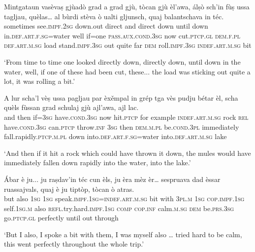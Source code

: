 \begin{linenumbers}
\gll  Mintgataun vasèvaṣ gjùadò grad a grad gjù, tòcan gjù èl’awa, álṣò sch’in fùṣ ussa tagljau, quèlas… al bùrdi stèva ò ualti gljunsch, quaj balantschava in téc.  \\
sometimes see.\textsc{impf.2sg} down.out direct and direct down until down in.\textsc{def.art.f.sg=}water well if=one \textsc{pass.aux.cond.3sg} now cut.\textsc{ptcp.gl} \textsc{dem.f.pl}  \textsc{def.art.m.sg} load  stand.\textsc{impf.3sg} out quite far \textsc{dem} roll.\textsc{impf.3sg}  \textsc{indef.art.m.sg} bit   \\
\end{linenumbers}
\medskip
\glt `From time to time one looked directly down, directly down, until down in the water, well, if one of these had been cut, these... the load was sticking out quite a lot, it was rolling a bit.'
\medskip

\begin{linenumbers}
\gll   A lur scha’l vèṣ ussa pagljau par èxěmpal in grép tga vès pudju bétar èl, scha quèls fùssan grad schulaj gjù ajl’awa, ajl lac. \\
and then if=\textsc{3sg} have.\textsc{cond.3sg} now hit.\textsc{ptcp} for example \textsc{indef.art.m.sg} rock \textsc{rel} have.\textsc{cond.3sg}  can.\textsc{ptcp} throw.\textsc{inf} \textsc{3sg} then \textsc{dem.m.pl} be.\textsc{cond.3pl} immediately fall.rapidly.\textsc{ptcp.m.pl} down into.\textsc{def.art.f.sg}=water into.\textsc{def.art.m.sg} lake\\
\end{linenumbers}
\medskip
\glt `And then if it hit a rock which could have thrown it down, the mules would have immediately fallen down rapidly into the water, into the lake.'
\medskip

\begin{linenumbers}
\gll Ábar è ju... ju raṣdav'in téc cun èls, ju èra mèz èr… sespruava dad èssar ruassajvals, quaj è ju tiptòp, tòcan ò atras.   \\
but also \textsc{1sg} \textsc{1sg} speak.\textsc{impf.1sg}=\textsc{indef.art.m.sg} bit with  \textsc{3pl.m} \textsc{1sg} \textsc{cop.impf.1sg} self.\textsc{1sg.m} also \textsc{refl.}try.hard.\textsc{impf.1sg} \textsc{comp} \textsc{cop.inf}  calm.\textsc{m.sg} \textsc{dem} be.\textsc{prs.3sg} go.\textsc{ptcp.gl} perfectly until out through \\
\end{linenumbers} 
\medskip
\glt `But I also, I spoke a bit with them, I was myself also … tried hard to be calm, this went perfectly throughout the whole trip.'
\medskip

